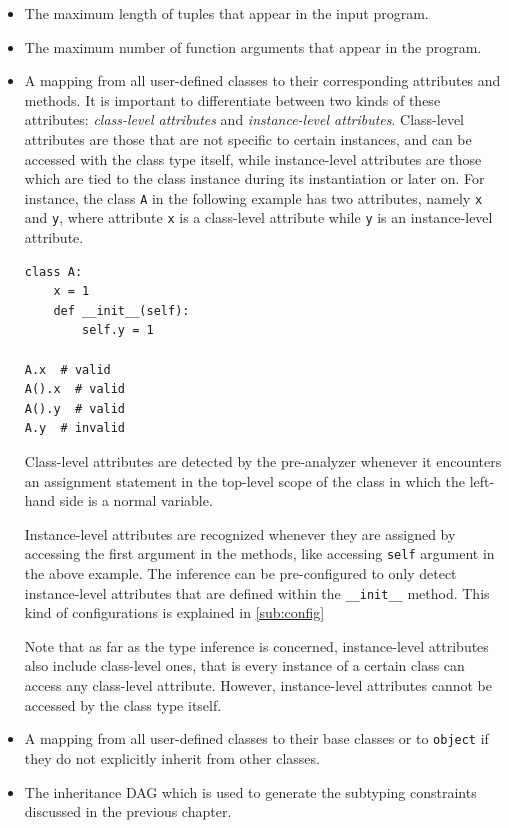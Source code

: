 \begin{itemize}
	\item The maximum length of tuples that appear in the input program.
	\item The maximum number of function arguments that appear in the program.
	\item A mapping from all user-defined classes to their corresponding attributes and methods. It is important to differentiate between two kinds of these attributes: \textit{class-level attributes} and \textit{instance-level attributes}. Class-level attributes are those that are not specific to certain instances, and can be accessed with the class type itself, while instance-level attributes are those which are tied to the class instance during its instantiation or later on. For instance, the class \lstinline|A| in the following example has two attributes, namely \lstinline|x| and \lstinline|y|, where attribute \lstinline|x| is a class-level attribute while \lstinline|y| is an instance-level attribute.
	
	\begin{lstlisting}
class A:
	x = 1
	def __init__(self):
		self.y = 1
		
A.x  # valid
A().x  # valid
A().y  # valid
A.y  # invalid
	\end{lstlisting}
	
	Class-level attributes are detected by the pre-analyzer whenever it encounters an assignment statement in the top-level scope of the class in which the left-hand side is a normal variable.
	
	Instance-level attributes are recognized whenever they are assigned by accessing the first argument in the methods, like accessing \lstinline|self| argument in the above example. The inference can be pre-configured to only detect instance-level attributes that are defined within the \lstinline|__init__| method. This kind of configurations is explained in \ref{sub:config}
	
	Note that as far as the type inference is concerned, instance-level attributes also include class-level ones, that is every instance of a certain class can access any class-level attribute. However, instance-level attributes cannot be accessed by the class type itself.
	
	\item A mapping from all user-defined classes to their base classes or to \lstinline|object| if they do not explicitly inherit from other classes.
	\item The inheritance DAG which is used to generate the subtyping constraints discussed in the previous chapter.
\end{itemize}

